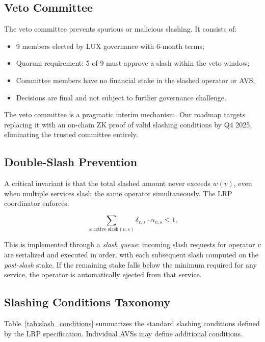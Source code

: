 \subsection{Veto Committee}

The veto committee prevents spurious or malicious slashing. It consists of:

\begin{itemize}[leftmargin=1.5em]
  \item 9 members elected by LUX governance with 6-month terms;
  \item Quorum requirement: 5-of-9 must approve a slash within the veto window;
  \item Committee members have no financial stake in the slashed operator or AVS;
  \item Decisions are final and not subject to further governance challenge.
\end{itemize}

\begin{remark}
The veto committee is a pragmatic interim mechanism. Our roadmap targets replacing it with
an on-chain ZK proof of valid slashing conditions by Q4 2025, eliminating the trusted
committee entirely.
\end{remark}

\subsection{Double-Slash Prevention}

A critical invariant is that the total slashed amount never exceeds $w(v)$, even when
multiple services slash the same operator simultaneously. The LRP coordinator enforces:

\[
  \sum_{s: \text{active slash}(v,s)} \delta_{v,s} \cdot \alpha_{v,s} \leq 1.
\]

This is implemented through a \emph{slash queue}: incoming slash requests for operator $v$
are serialized and executed in order, with each subsequent slash computed on the
\emph{post-slash} stake. If the remaining stake falls below the minimum required for any
service, the operator is automatically ejected from that service.

\subsection{Slashing Conditions Taxonomy}

Table~\ref{tab:slash_conditions} summarizes the standard slashing conditions defined by
the LRP specification. Individual AVSs may define additional conditions.

